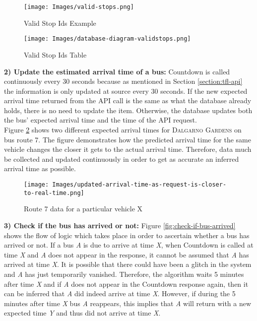 \begin{figure}[H]
\centering
\begin{minipage}{.65\textwidth}
  \centering
  \texttt{[image: Images/valid-stops.png]}
  \caption{Valid Stop Ids Example}
  \label{fig:valid-stops-db}
\end{minipage}%
\begin{minipage}{.35\textwidth}
  \centering
  \texttt{[image: Images/database-diagram-validstops.png]}
  \caption{Valid Stop Ids Table}
  \label{fig:valid-stops-db-design}
\end{minipage}
\end{figure}

\textbf{2) Update the estimated arrival time of a bus: } Countdown is called continuously every 30 seconds because as mentioned in Section \ref{section:tfl-api} the information is only updated at source every 30 seconds. If the new expected arrival time returned from the API call is the same as what the database already holds, there is no need to update the item. Otherwise, the database updates both the bus' expected arrival time and the time of the API request. \\

Figure \ref{fig:more-accurate-closer-to-eta} shows two different expected arrival times for \textsc{Dalgarno Gardens} on bus route 7. The figure demonstrates how the predicted arrival time for the same vehicle changes the closer it gets to the actual arrival time. Therefore, data much be collected and updated continuously in order to get as accurate an inferred arrival time as possible.

\begin{figure}[H]
\begin{center}
    \texttt{[image: Images/updated-arrival-time-as-request-is-closer-to-real-time.png]}
    \caption{Route 7 data for a particular vehicle X}
    \label{fig:more-accurate-closer-to-eta}
\end{center}
\end{figure}

\textbf{3) Check if the bus has arrived or not:} Figure \ref{fig:check-if-bus-arrived} shows the flow of logic which takes place in order to ascertain whether a bus has arrived or not. If a bus \textit{A} is due to arrive at time \textit{X}, when Countdown is called at time \textit{X} and \textit{A} does not appear in the response, it cannot be assumed that \textit{A} has arrived at time \textit{X}. It is possible that there could have been a glitch in the system and \textit{A} has just temporarily vanished. Therefore, the algorithm waits 5 minutes after time \textit{X} and if \textit{A} does not appear in the Countdown response again, then it can be inferred that \textit{A} did indeed arrive at time \textit{X}. However, if during the 5 minutes after time \textit{X} bus \textit{A} reappears, this implies that \textit{A} will return with a new expected time \textit{Y} and thus did not arrive at time \textit{X}. 

